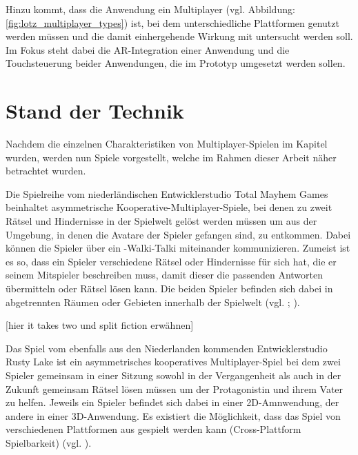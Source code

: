 Hinzu kommt, dass die Anwendung ein  Multiplayer (vgl. Abbildung: \ref{fig:lotz_multiplayer_types}) ist, bei dem unterschiedliche Plattformen genutzt werden müssen und die damit einhergehende Wirkung mit untersucht werden soll. Im Fokus steht dabei die \ac{AR}-Integration einer Anwendung und die Touchsteuerung beider Anwendungen, die im Prototyp umgesetzt werden sollen.


\chapter{Stand der Technik} \label{sec:sota}

Nachdem die einzelnen Charakteristiken von Multiplayer-Spielen im Kapitel \emph{} wurden, werden nun Spiele vorgestellt, welche im Rahmen dieser Arbeit näher betrachtet wurden.

Die Spielreihe  vom niederländischen Entwicklerstudio Total Mayhem Games beinhaltet asymmetrische Kooperative-Multiplayer-Spiele, bei denen zu zweit Rätsel und Hindernisse in der Spielwelt gelöst werden müssen um aus der Umgebung, in denen die Avatare der Spieler gefangen sind, zu entkommen. Dabei können die Spieler über ein -Walki-Talki miteinander kommunizieren. Zumeist ist es so, dass ein Spieler verschiedene Rätsel oder Hindernisse für sich hat, die er seinem Mitspieler beschreiben muss, damit dieser die passenden Antworten übermitteln oder Rätsel lösen kann. Die beiden Spieler befinden sich dabei in abgetrennten Räumen oder Gebieten innerhalb der Spielwelt (vgl. \cite{noauthor_we_nodate}; \cite{noauthor_total_nodate}).  

[hier it takes two und split fiction erwähnen]

Das Spiel  vom ebenfalls aus den Niederlanden kommenden Entwicklerstudio Rusty Lake ist ein asymmetrisches kooperatives Multiplayer-Spiel bei dem zwei Spieler gemeinsam in einer Sitzung sowohl in der Vergangenheit als auch in der Zukunft gemeinsam Rätsel lösen müssen um der Protagonistin und ihrem Vater zu helfen. Jeweils ein Spieler befindet sich dabei in einer 2D-Amnwendung, der andere in einer 3D-Anwendung. Es existiert die Möglichkeit, dass das Spiel von verschiedenen Plattformen aus gespielt werden kann (Cross-Plattform Spielbarkeit) (vgl. \cite{noauthor_past_nodate}). 

